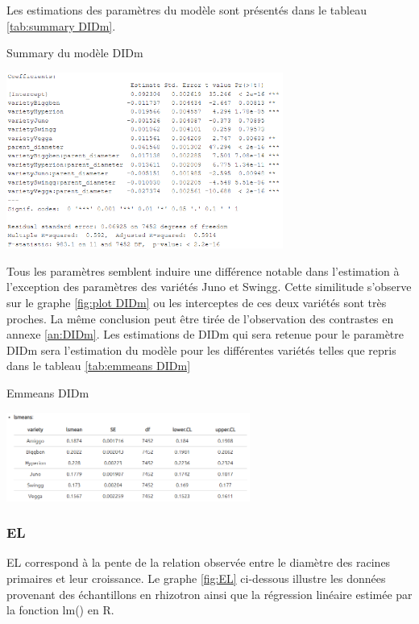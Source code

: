 Les estimations des paramètres du modèle sont présentés dans le tableau \ref{tab:summary DIDm}.
\newpage

\begin{table}[ht]
    \centering
    \caption{Summary du modèle DIDm}
    \includegraphics[width=0.68\textwidth]{Image/summary DIDm.png}
    \label{tab:summary DIDm}
\end{table}

Tous les paramètres semblent induire une différence notable dans l'estimation à l'exception des paramètres des variétés Juno et Swingg.
Cette similitude s'observe sur le graphe \ref{fig:plot DIDm} ou les interceptes de ces deux variétés sont très proches.
La même conclusion peut être tirée de l'observation des contrastes en annexe \ref{an:DIDm}.
Les estimations de DIDm qui sera retenue pour le paramètre DIDm sera l'estimation du modèle pour les différentes variétés telles que repris dans le tableau \ref{tab:emmeans DIDm}

\begin{table}[ht]
    \centering
    \caption{Emmeans DIDm}
    \includegraphics[width=0.6\textwidth]{Image/lsmeans DIDm.png}
    \label{tab:emmeans DIDm}
\end{table}

\subsubsection{EL}

EL correspond à la pente de la relation observée entre le diamètre des racines primaires et leur croissance.
Le graphe \ref{fig:EL} ci-dessous illustre les données provenant des échantillons en rhizotron ainsi que la régression linéaire estimée par la fonction lm() en R.
\newpage

